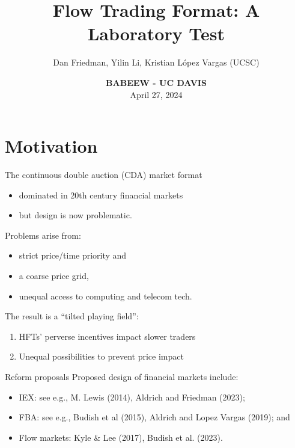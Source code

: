 \documentclass[10pt]{beamer}
\title[FlowTrading]{Flow Trading Format: A Laboratory Test}
\author[DF-YL-KL]{Dan Friedman, Yilin Li, Kristian L\'opez Vargas (UCSC)}
\institute[UCSC]{}
\date[4/27/2024]{\vspace{1cm} \textbf{BABEEW - UC DAVIS} \\
April 27, 2024}
\begin{document}
\maketitle


\section{Motivation}
\begin{frame}{
The continuous double auction (CDA) market format}
\begin{itemize}
\item dominated in 20th century financial markets 
\item but design is now problematic.  %
\end{itemize}
Problems arise from:
\begin{itemize}
\item strict price/time priority and 
\item a coarse price grid, 
\item unequal access to computing and telecom tech.

\end{itemize} %
The result is a ``tilted playing field'': 
\begin{enumerate}
\item HFTs' perverse incentives impact slower traders
\item Unequal possibilities to prevent price impact
   \end{enumerate}
\end{frame}

\begin{frame}{Reform proposals}
Proposed design of financial markets include:
    \begin{itemize}
\item IEX: see e.g., M. Lewis (2014), Aldrich and Friedman (2023); %
\item FBA: see e.g., Budish et al (2015), Aldrich and Lopez Vargas (2019); and %
\item Flow markets:  Kyle \& Lee (2017), Budish et al. (2023).
\end{itemize}
\end{frame}
\end{document}
